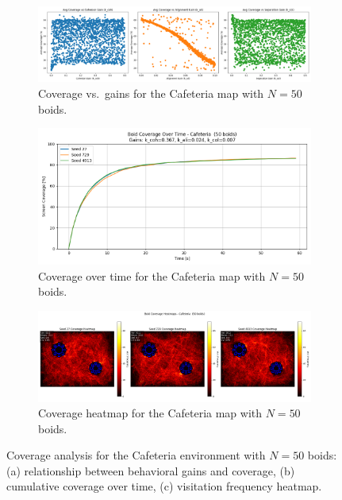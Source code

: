 \documentclass[12pt]{article}
\begin{document}
\begin{figure}[h!]
  \centering
  \begin{subfigure}[b]{0.32\linewidth}
    \includegraphics[width=\linewidth]{cov_vs_gains/cafeteria_50.png}
    \caption{Coverage vs.~gains for the Cafeteria map with $N=50$ boids.}
    \label{fig:app:caf50_gains}
  \end{subfigure}\hfill
  \begin{subfigure}[b]{0.32\linewidth}
    \includegraphics[width=\linewidth]{optimal_cov_vs_time/cafeteria_50.png}
    \caption{Coverage over time for the Cafeteria map with $N=50$ boids.}
    \label{fig:app:caf50_time}
  \end{subfigure}\hfill
  \begin{subfigure}[b]{0.32\linewidth}
    \includegraphics[width=\linewidth]{heatmaps/cafeteria_50.png}
    \caption{Coverage heatmap for the Cafeteria map with $N=50$ boids.}
    \label{fig:app:caf50_heat}
  \end{subfigure}
  \caption{Coverage analysis for the Cafeteria environment with $N=50$ boids: (a) relationship between behavioral gains and coverage, (b) cumulative coverage over time, (c) visitation frequency heatmap.}
  \label{fig:app:cafeteria50}
\end{figure}
\end{document}
